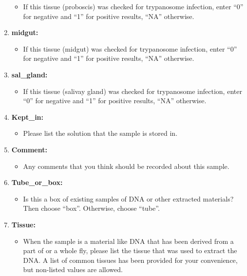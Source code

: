 \documentclass[letterpaper]{scrreprt}
\begin{document}
\begin{enumerate}
  \begin{itemize}
  \itemsep1pt\parskip0pt
  \item
    If this tissue (proboscis) was checked for trypanosome infection,
    enter ``0'' for negative and ``1'' for positive results, ``NA''
    otherwise.
  \end{itemize}
\item
  \textbf{midgut:}

  \begin{itemize}
  \itemsep1pt\parskip0pt
  \item
    If this tissue (midgut) was checked for trypanosome infection, enter
    ``0'' for negative and ``1'' for positive results, ``NA'' otherwise.
  \end{itemize}
\item
  \textbf{sal\_gland:}

  \begin{itemize}
  \itemsep1pt\parskip0pt
  \item
    If this tissue (salivay gland) was checked for trypanosome
    infection, enter ``0'' for negative and ``1'' for positive results,
    ``NA'' otherwise.
  \end{itemize}
\item
  \textbf{Kept\_in:}

  \begin{itemize}
  \itemsep1pt\parskip0pt
  \item
    Please list the solution that the sample is stored in.
  \end{itemize}
\item
  \textbf{Comment:}

  \begin{itemize}
  \itemsep1pt\parskip0pt
  \item
    Any comments that you think should be recorded about this sample.
  \end{itemize}
\item
  \textbf{Tube\_or\_box:}

  \begin{itemize}
  \itemsep1pt\parskip0pt
  \item
    Is this a box of existing samples of DNA or other extracted
    materials? Then choose ``box''. Otherwise, choose ``tube''.
  \end{itemize}
\item
  \textbf{Tissue:}

  \begin{itemize}
  \item
    When the sample is a material like DNA that has been derived from a
    part of or a whole fly, please list the tissue that was used to
    extract the DNA. A list of common tissues has been provided for your
    convenience, but non-listed values are allowed.


\end{itemize}
\end{enumerate}
\end{document}
